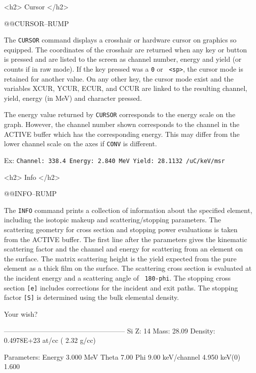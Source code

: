 {{{{{<h2> Cursor </h2>


@@{CURSOR--RUMP}

The {\tt CURSOR} command displays a crosshair or hardware cursor on graphics
so equipped.  The coordinates of the crosshair are returned when any key or
button is pressed and are listed to the screen as channel number, energy and
yield (or counts if in raw mode).  If the key pressed was a {\tt 0} or {\tt
<sp>}, the cursor mode is retained for another value.  On any other key, the
cursor mode exist and the variables {\tts XCUR, YCUR, ECUR}, and {\tts CCUR}
are linked to the resulting channel, yield, energy (in MeV) and character
pressed.

The energy value returned by {\tt CURSOR} corresponds to the energy scale on
the graph.  However, the channel number shown corresponds to the channel in
the ACTIVE buffer which has the corresponding energy.  This may differ from
the lower channel scale on the axes if {\tt CONV} is different.

Ex: {\tt Channel:  338.4   Energy:  2.840 MeV   Yield:  28.1132 /uC/keV/msr}

\newpage
<h2> Info </h2>


@@{INFO--RUMP}

The {\tt INFO} command prints a collection of information about the specified
element, including the isotopic makeup and scattering/stopping parameters.
The scattering geometry for cross section and stopping power evaluations is
taken from the ACTIVE buffer.  The first line after the parameters gives the
kinematic scattering factor and the channel and energy for scattering from an
element on the surface.  The matrix scattering height is the yield expected
from the pure element as a thick film on the surface.  The scattering cross
section is evaluated at the incident energy and a scattering angle of {\tt
180-phi}.  The stopping cross section {\tt [e]} includes corrections for the
incident and exit paths.  The stopping factor {\tt [S]} is determined using
the bulk elemental density.

\medskip\beginscreen
Your wish? 

 -----------------------------------------------------
 Si  Z: 14  Mass:  28.09  Density:  0.4978E+23 at/cc ( 2.32 g/cc)

 Parameters: Energy  3.000 MeV  Theta  7.00     Phi   9.00
             keV/channel 4.950     keV(0)   1.600

}}}}}
